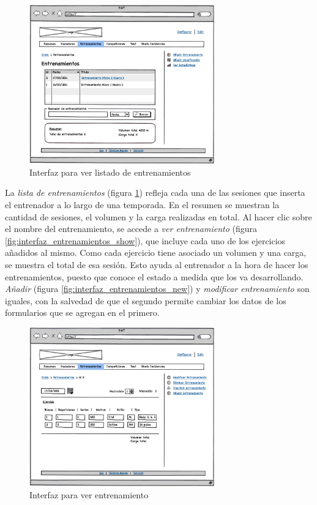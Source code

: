   		\begin{figure}[H]
  		  \centering
  		    \includegraphics[width=8cm]{./eps/p_interfaz/18_Entrenamientos.eps}
  		  \caption{Interfaz para ver listado de entrenamientos}
  		  \label{fig:interfaz_entrenamientos}
  		\end{figure}

  	La {\it lista de entrenamientos} (figura \ref{fig:interfaz_entrenamientos}) refleja cada una de las sesiones que inserta el entrenador a lo largo de una temporada. En el resumen se muestran la cantidad de sesiones, el volumen y la carga realizadas en total. Al hacer clic sobre el nombre del entrenamiento, se accede a {\it ver entrenamiento} (figura \ref{fig:interfaz_entrenamientos_show}), que incluye cada uno de los ejercicios añadidos al mismo. Como cada ejercicio tiene asociado un volumen y una carga, se muestra el total de esa sesión. Esto ayuda al entrenador a la hora de hacer los entrenamientos, puesto que conoce el estado a medida que los va desarrollando.\\
  	\newline
  	{\it Añadir} (figura \ref{fig:interfaz_entrenamientos_new}) y {\it modificar entrenamiento} son iguales, con la salvedad de que el segundo permite cambiar los datos de los formularios que se agregan en el primero.

  		\begin{figure}[H]
  		  \centering
  		    \includegraphics[width=8cm]{./eps/p_interfaz/20_Entrenamientos_show.eps}
  		  \caption{Interfaz para ver entrenamiento}
  		  \label{fig:interfaz_competiciones_show}
  		\end{figure}

